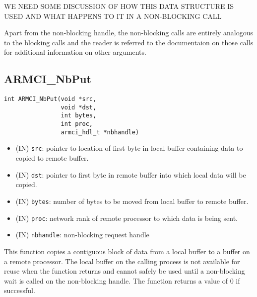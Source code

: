 \documentclass[12pt]{article}
\begin{document}
WE NEED SOME DISCUSSION OF HOW THIS DATA STRUCTURE IS USED AND WHAT HAPPENS TO
IT IN A NON-BLOCKING CALL

Apart from the non-blocking handle, the non-blocking calls are entirely
analogous to the blocking calls and the reader is referred to the documentaion
on those calls for additional information on other arguments.
\subsection{ARMCI\_NbPut}
\begin{verbatim}
int ARMCI_NbPut(void *src,
                void *dst,
                int bytes,
                int proc,
                armci_hdl_t *nbhandle)
\end{verbatim}
\begin{itemize}
\item (IN) \texttt{src}: pointer to location of first byte in local buffer
containing data to copied to remote buffer.
\item (IN) \texttt{dst}: pointer to first byte in remote buffer into which local
data will be copied.
\item (IN) \texttt{bytes}: number of bytes to be moved from local buffer to
remote buffer.
\item (IN) \texttt{proc}: network rank of remote processor to which data is
being sent.
\item (IN) \texttt{nbhandle}: non-blocking request handle
\end{itemize}
This function copies a contiguous block of data from a local buffer to a buffer
on a remote processor. The local buffer on the calling process is not available for
reuse when the function returns and cannot safely be used until a non-blocking
wait is called on the non-blocking handle. The function returns a value of 0
if successful.
\end{document}

